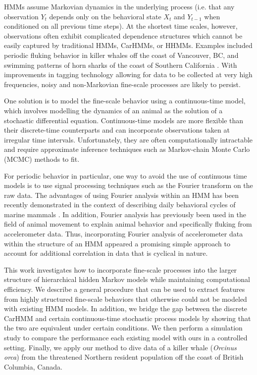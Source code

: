 HMMs assume Markovian dynamics in the underlying process (i.e. that any observation $Y_t$ depends only on the behavioral state $X_t$ and $Y_{t-1}$ when conditioned on all previous time steps). At the shortest time scales, however, observations often exhibit complicated dependence structures which cannot be easily captured by traditional HMMs, CarHMMs, or HHMMs. Examples included periodic fluking behavior in killer whales off the coast of Vancouver, BC, and swimming patterns of horn sharks of the coast of Southern California \citep{Adam:2019}.  With improvements in tagging technology allowing for data to be collected at very high frequencies, noisy and non-Markovian fine-scale processes are likely to persist.

One solution is to model the fine-scale behavior using a continuous-time model, which involves modelling the dynamics of an animal as the solution of a stochastic differential equation. Continuous-time models are more flexible than their discrete-time counterparts and can incorporate observations taken at irregular time intervals. Unfortunately, they are often computationally intractable and require approximate inference techniques such as Markov-chain Monte Carlo (MCMC) methods to fit.

For periodic behavior in particular, one way to avoid the use of continuous time models is to use signal processing techniques such as the Fourier transform on the raw data. The advantages of using Fourier analysis within an HMM has been recently demonstrated in the context of describing daily behavioral cycles of marine mammals \citep{Heerah:2017}. In addition, Fourier analysis has previously been used in the field of animal movement to explain animal behavior \citep{Fehlmann:2017} and specifically fluking \citep{Shorter:2017} from accelerometer data. Thus, incorporating Fourier analysis of accelerometer data within the structure of an HMM appeared a promising simple approach to account for additional correlation in data that is cyclical in nature.

This work investigates how to incorporate fine-scale processes into the larger structure of hierarchical hidden Markov models while maintaining computational efficiency. We describe a general procedure that can be used to extract features from highly structured fine-scale behaviors that otherwise could not be modeled with existing HMM models. In addition, we bridge the gap between the discrete CarHMM and certain continuous-time stochastic process models by showing that the two are equivalent under certain conditions. We then perform a simulation study to compare the performance each existing model with ours in a controlled setting. Finally, we apply our method to dive data of a killer whale (\textit{Orcinus orca}) from the threatened Northern resident population off the coast of British Columbia, Canada.



